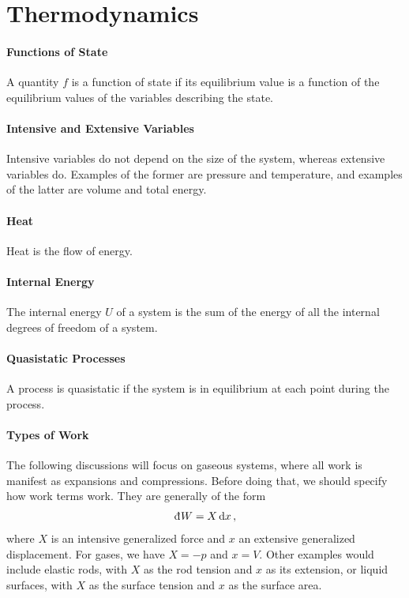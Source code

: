 \section{Thermodynamics}

\paragraph{Functions of State}
A quantity $f$ is a function of state if its equilibrium value is a function of the equilibrium values of the variables describing the state.

\paragraph{Intensive and Extensive Variables}
Intensive variables do not depend on the size of the system, whereas extensive variables do. Examples of the former are pressure and temperature, and examples of the latter are volume and total energy.

\paragraph{Heat}
Heat is the flow of energy.

\paragraph{Internal Energy}
The internal energy $U$ of a system is the sum of the energy of all the internal degrees of freedom of a system.

\paragraph{Quasistatic Processes}
A process is quasistatic if the system is in equilibrium at each point during the process.

\paragraph{Types of Work}
The following discussions will focus on gaseous systems, where all work is manifest as expansions and compressions. Before doing that, we should specify how work terms work. They are generally of the form
\begin{align*}
	\din{W} = X\dd{x},
\end{align*}
where $X$ is an intensive generalized force and $x$ an extensive generalized displacement. For gases, we have $X = -p$ and $x = V$. Other examples would include elastic rods, with $X$ as the rod tension and $x$ as its extension, or liquid surfaces, with $X$ as the surface tension and $x$ as the surface area.

